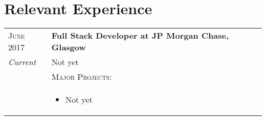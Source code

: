 \section{Relevant Experience}

\begin{tabular}{p{60pt}|p{11cm}}
	\hspace*{\fill}\textsc{June 2017} & \textbf{Full Stack Developer at JP Morgan Chase, Glasgow} \\
	
	\hspace*{\fill}\emph{Current}& \small{
		Not yet
	} \\

	\ & \vspace{1pt}\textsc{Major Projects}: \\

	&\vspace{-0.9em}\begin{itemize}[itemsep=0pt,topsep=0pt,leftmargin=*]\small
		\item Not yet
	\end{itemize}\vspace{-1.5em}

\end{tabular} \\ \\ \\
